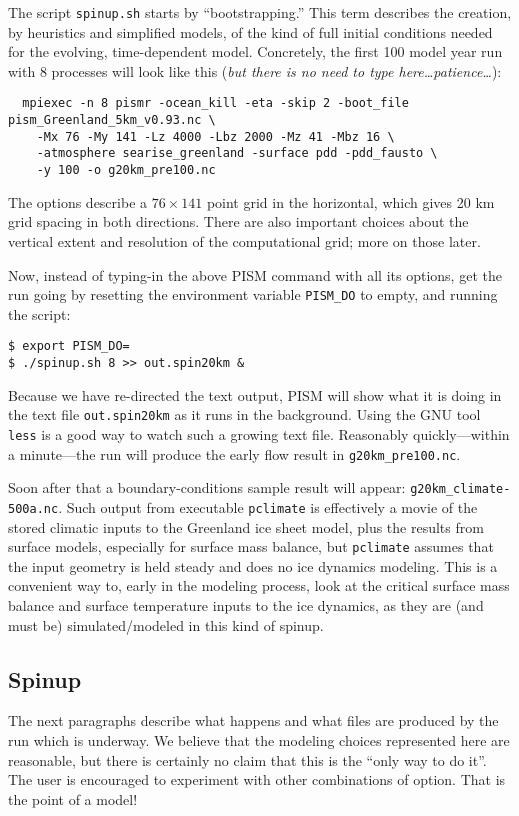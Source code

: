 The script \texttt{spinup.sh} starts by ``bootstrapping.''  This term describes the creation, by heuristics and simplified models, of the kind of full initial conditions needed for the evolving, time-dependent model.  Concretely, the first 100 model year run with 8 processes will look like this (\emph{but there is no need to type here\dots patience\dots}):
\small
\begin{verbatim}
  mpiexec -n 8 pismr -ocean_kill -eta -skip 2 -boot_file pism_Greenland_5km_v0.93.nc \
    -Mx 76 -My 141 -Lz 4000 -Lbz 2000 -Mz 41 -Mbz 16 \
    -atmosphere searise_greenland -surface pdd -pdd_fausto \
    -y 100 -o g20km_pre100.nc
\end{verbatim}
\normalsize
The options describe a $76\times 141$ point grid in the horizontal, which gives 20 km grid spacing in both directions.  There are also important choices about the vertical extent and resolution of the computational grid; more on those later.  

Now, instead of typing-in the above PISM command with all its options, get the run going by resetting the environment variable \texttt{PISM_DO} to empty, and running the script:
\begin{verbatim}
$ export PISM_DO=
$ ./spinup.sh 8 >> out.spin20km &
\end{verbatim}
\noindent Because we have re-directed the text output, PISM will show what it is doing in the text file \texttt{out.spin20km} as it runs in the background.  Using the GNU tool \texttt{less} is a good way to watch such a growing text file.  Reasonably quickly---within a minute---the run will produce the early flow result in \texttt{g20km_pre100.nc}.

Soon after that a boundary-conditions sample result will appear: \texttt{g20km_climate-500a.nc}.  Such output from executable \texttt{pclimate} is effectively a movie of the stored climatic inputs to the Greenland ice sheet model, plus the results from surface models, especially for surface mass balance, but \texttt{pclimate} assumes that the input geometry is held steady and does no ice dynamics modeling.  This is a convenient way to, early in the modeling process, look at the critical surface mass balance and surface temperature inputs to the ice dynamics, as they are (and must be) simulated/modeled in this kind of spinup.

\subsection{Spinup}  \label{subsect:spinupsketch}  The next paragraphs describe what happens and what files are produced by the run which is underway.  We believe that the modeling choices represented here are reasonable, but there is certainly no claim that this is the ``only way to do it''.  The user is encouraged to experiment with other combinations of option.  That is the point of a model!

